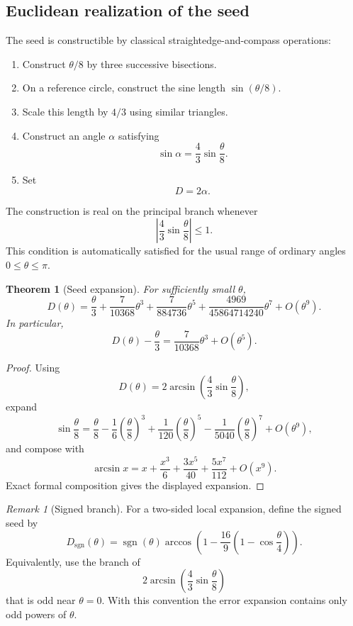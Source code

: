 \documentclass[11pt]{article}
\newtheorem{theorem}{Theorem}
\theoremstyle{remark}
\newtheorem{remark}{Remark}
\begin{document}
\subsection{Euclidean realization of the seed}

The seed is constructible by classical straightedge-and-compass operations:
\begin{enumerate}[label=\arabic*.]
\item Construct $\theta/8$ by three successive bisections.
\item On a reference circle, construct the sine length $\sin(\theta/8)$.
\item Scale this length by $4/3$ using similar triangles.
\item Construct an angle $\alpha$ satisfying
\[
\sin\alpha
=
\frac43\sin\frac{\theta}{8}.
\]
\item Set
\[
D=2\alpha.
\]
\end{enumerate}
The construction is real on the principal branch whenever
\[
\left|\frac43\sin\frac{\theta}{8}\right|
\le 1.
\]
This condition is automatically satisfied for the usual range of ordinary angles
$0\le \theta\le \pi$.

\begin{theorem}[Seed expansion]\label{thm:seed}
For sufficiently small $\theta$,
\[
D(\theta)
=
\frac{\theta}{3}
+
\frac{7}{10368}\theta^3
+
\frac{7}{884736}\theta^5
+
\frac{4969}{45864714240}\theta^7
+
O(\theta^9).
\]
In particular,
\[
D(\theta)-\frac{\theta}{3}
=
\frac{7}{10368}\theta^3+O(\theta^5).
\]
\end{theorem}

\begin{proof}
Using
\[
D(\theta)
=
2\arcsin\!\left(
\frac43\sin\frac{\theta}{8}
\right),
\]
expand
\[
\sin\frac{\theta}{8}
=
\frac{\theta}{8}
-
\frac{1}{6}\left(\frac{\theta}{8}\right)^3
+
\frac{1}{120}\left(\frac{\theta}{8}\right)^5
-
\frac{1}{5040}\left(\frac{\theta}{8}\right)^7
+
O(\theta^9),
\]
and compose with
\[
\arcsin x
=
x+\frac{x^3}{6}+\frac{3x^5}{40}+\frac{5x^7}{112}+O(x^9).
\]
Exact formal composition gives the displayed expansion.
\end{proof}

\begin{remark}[Signed branch]
For a two-sided local expansion, define the signed seed by
\[
D_{\mathrm{sgn}}(\theta)
=
\operatorname{sgn}(\theta)
\arccos\!\left(
1-\frac{16}{9}\left(1-\cos\frac{\theta}{4}\right)
\right).
\]
Equivalently, use the branch of
\[
2\arcsin\!\left(\frac43\sin\frac{\theta}{8}\right)
\]
that is odd near $\theta=0$.  With this convention the error expansion contains only odd
powers of $\theta$.
\end{remark}
\end{document}
